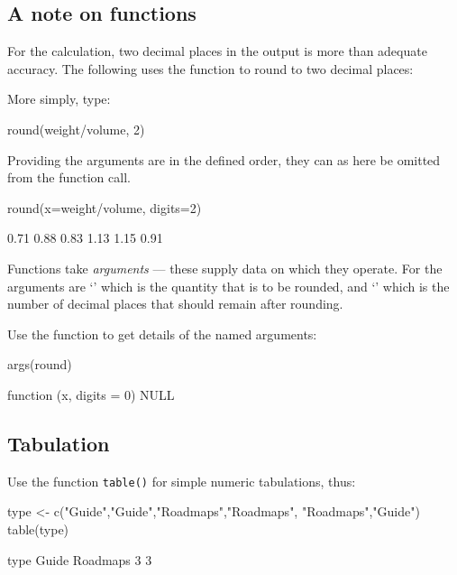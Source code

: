 \subsection*{A note on functions}

For the  calculation, two decimal places in the output
is more than adequate accuracy. The following uses the function
 to round to two decimal places:
\begin{marginfigure}[24pt]
More simply, type:
\begin{Schunk}
\begin{Sinput}
round(weight/volume, 2)
\end{Sinput}
\end{Schunk}
Providing the arguments are in the defined
order, they can as here be omitted from
the function call.
\end{marginfigure}
\begin{Schunk}
\begin{Sinput}
round(x=weight/volume, digits=2)
\end{Sinput}
\begin{Soutput}
[1] 0.71 0.88 0.83 1.13 1.15 0.91
\end{Soutput}
\end{Schunk}

  Functions take {\em arguments} --- these supply
data on which they operate.  For  the arguments are
`' which is the quantity that is to be rounded, and
`' which is the number of decimal places that should
remain after rounding.

Use the function  to get details of the named
arguments:
\begin{Schunk}
\begin{Sinput}
args(round)
\end{Sinput}
\begin{Soutput}
function (x, digits = 0) 
NULL
\end{Soutput}
\end{Schunk}

\subsection*{Tabulation}
Use the function \texttt{table()} for simple numeric tabulations,
thus:
\begin{Schunk}
\begin{Sinput}
type <- c("Guide","Guide","Roadmaps","Roadmaps",
          "Roadmaps","Guide")
table(type)
\end{Sinput}
\begin{Soutput}
type
   Guide Roadmaps 
       3        3 
\end{Soutput}
\end{Schunk}

